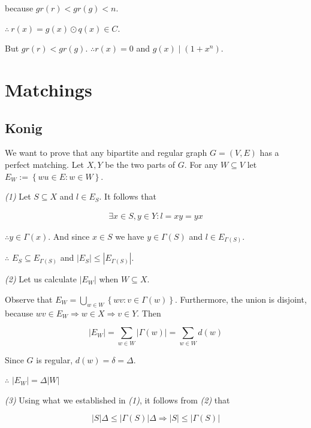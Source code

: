 because $gr(r) < gr(g) < n$.

$\therefore ~ r(x) = g(x) \odot  q(x) \in C$.

But $gr(r) < gr(g)$. $\therefore  r(x) = 0$ and $g(x) \mid (1 + x^n)$.



\pagebreak

\section{Matchings}

\subsection{Konig}

We want to prove that any bipartite and regular graph $G = (V, E) $ has a
perfect matching. Let $X, Y$ be the two parts of $G$. For any $W \subseteq V$
let $E_W := \left\{ wu \in E : w \in W \right\} $.

\textit{(1)} Let $S \subseteq X$ and $l \in E_S$. It follows that

\begin{align*}
    \exists x \in S, y \in Y : l = xy = yx 
\end{align*}

$\therefore y \in \Gamma(x)$. And since $x \in  S$ we have $y \in \Gamma(S)$ 
and $l \in E_{\Gamma(S)}$.

$\therefore $ $E_S \subseteq E_{\Gamma(S)}$ and $|E_S| \leq |E_{\Gamma(S)}|$.

\textit{(2)} Let us calculate $|E_W|$ when $W \subseteq X$.

Observe that $E_W = \bigcup_{w \in W} \left\{ wv : v \in \Gamma(w) \right\} $.
Furthermore, the union is disjoint, because $wv \in E_W \Rightarrow w \in X
\Rightarrow v \in Y$. Then

\begin{equation*}
    |E_W| = \sum_{w \in W} |\Gamma(w)| = \sum_{w \in W} d(w)
\end{equation*}

Since $G$ is regular, $d(w) = \delta = \Delta$. 

$\therefore $ $|E_W| = \Delta |W|$

\textit{(3)} Using what we established in \textit{(1)}, it follows from \textit{(2)} that

\begin{equation*}
    |S| \Delta \leq |\Gamma(S)| \Delta \Rightarrow |S| \leq |\Gamma(S)| 
\end{equation*}

